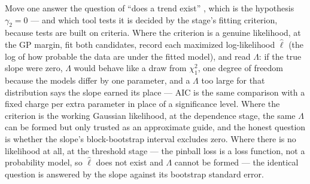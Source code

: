 \documentclass[11pt]{article}
\begin{document}
{\color{blue}Move one answer the question of ``does a trend exist'' , which is the hypothesis $\gamma_2 = 0$ --- and which tool tests it is decided by the stage's fitting criterion, because tests are built on criteria. Where the criterion is a genuine likelihood, at the GP margin, fit both candidates, record each maximized log-likelihood $\hat\ell$ (the log of how probable the data are under the fitted model), and read $\Lambda$: if the true slope were zero, $\Lambda$ would behave like a draw from $\chi^2_1$, one degree of freedom because the models differ by one parameter, and a $\Lambda$ too large for that distribution says the slope earned its place --- AIC is the same comparison with a fixed charge per extra parameter in place of a significance level. Where the criterion is the working Gaussian likelihood, at the dependence stage, the same $\Lambda$ can be formed but only trusted as an approximate guide, and the honest question is whether the slope's block-bootstrap interval excludes zero. Where there is no likelihood at all, at the threshold stage --- the pinball loss is a loss function, not a probability model, so $\hat\ell$ does not exist and $\Lambda$ cannot be formed --- the identical question is answered by the slope against its bootstrap standard error. 

}
\end{document}
